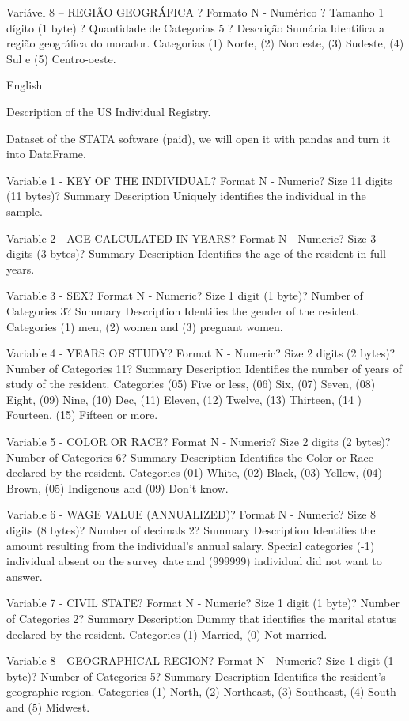 \documentclass[]{article}
\begin{document}
Variável 8 -- REGIÃO GEOGRÁFICA ? Formato N - Numérico ? Tamanho 1
dígito (1 byte) ? Quantidade de Categorias 5 ? Descrição Sumária
Identifica a região geográfica do morador. Categorias (1) Norte, (2)
Nordeste, (3) Sudeste, (4) Sul e (5) Centro-oeste.

English

Description of the US Individual Registry.

Dataset of the STATA software (paid), we will open it with pandas and
turn it into DataFrame.

Variable 1 - KEY OF THE INDIVIDUAL? Format N - Numeric? Size 11 digits
(11 bytes)? Summary Description Uniquely identifies the individual in
the sample.

Variable 2 - AGE CALCULATED IN YEARS? Format N - Numeric? Size 3 digits
(3 bytes)? Summary Description Identifies the age of the resident in
full years.

Variable 3 - SEX? Format N - Numeric? Size 1 digit (1 byte)? Number of
Categories 3? Summary Description Identifies the gender of the resident.
Categories (1) men, (2) women and (3) pregnant women.

Variable 4 - YEARS OF STUDY? Format N - Numeric? Size 2 digits (2
bytes)? Number of Categories 11? Summary Description Identifies the
number of years of study of the resident. Categories (05) Five or less,
(06) Six, (07) Seven, (08) Eight, (09) Nine, (10) Dec, (11) Eleven, (12)
Twelve, (13) Thirteen, (14 ) Fourteen, (15) Fifteen or more.

Variable 5 - COLOR OR RACE? Format N - Numeric? Size 2 digits (2 bytes)?
Number of Categories 6? Summary Description Identifies the Color or Race
declared by the resident. Categories (01) White, (02) Black, (03)
Yellow, (04) Brown, (05) Indigenous and (09) Don't know.

Variable 6 - WAGE VALUE (ANNUALIZED)? Format N - Numeric? Size 8 digits
(8 bytes)? Number of decimals 2? Summary Description Identifies the
amount resulting from the individual's annual salary. Special categories
(-1) individual absent on the survey date and (999999) individual did
not want to answer.

Variable 7 - CIVIL STATE? Format N - Numeric? Size 1 digit (1 byte)?
Number of Categories 2? Summary Description Dummy that identifies the
marital status declared by the resident. Categories (1) Married, (0) Not
married.

Variable 8 - GEOGRAPHICAL REGION? Format N - Numeric? Size 1 digit (1
byte)? Number of Categories 5? Summary Description Identifies the
resident's geographic region. Categories (1) North, (2) Northeast, (3)
Southeast, (4) South and (5) Midwest.
\end{document}
